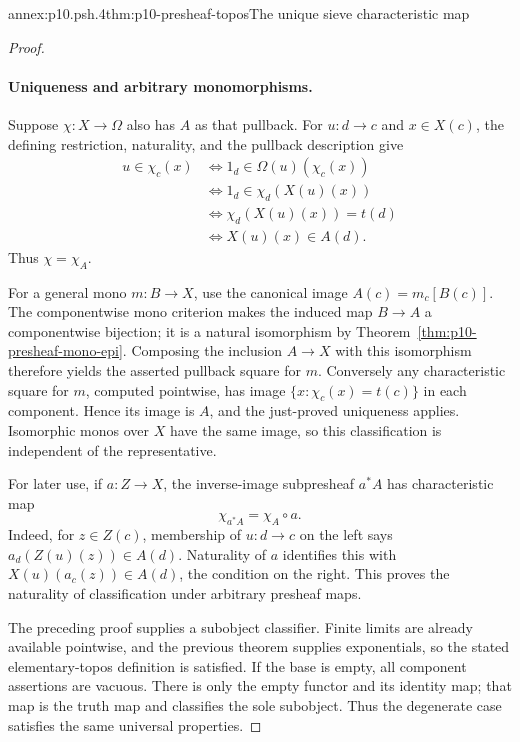 \begin{annexitem}{annex:p10.psh.4}{thm:p10-presheaf-topos}{The unique sieve characteristic map}
\begin{proof}
\paragraph{Uniqueness and arbitrary monomorphisms.}
Suppose \(\chi:X\to\Omega\) also has \(A\) as that pullback.
For \(u:d\to c\) and \(x\in X(c)\), the defining restriction,
naturality, and the pullback description give
\[
\begin{aligned}
 u\in\chi_c(x)
 &\Longleftrightarrow 1_d\in\Omega(u)(\chi_c(x))\\
 &\Longleftrightarrow 1_d\in\chi_d(X(u)(x))\\
 &\Longleftrightarrow \chi_d(X(u)(x))=t(d)\\
 &\Longleftrightarrow X(u)(x)\in A(d).
\end{aligned}
\]
Thus \(\chi=\chi_A\).

For a general mono \(m:B\to X\), use the canonical image
\(A(c)=m_c[B(c)]\).  The componentwise mono criterion makes
the induced map \(B\to A\) a componentwise bijection; it is
a natural isomorphism by
Theorem~\ref{thm:p10-presheaf-mono-epi}.
Composing the inclusion \(A\to X\) with this isomorphism
therefore yields the asserted pullback square for \(m\).
Conversely any characteristic square for \(m\), computed
pointwise, has image
\(\{x:\chi_c(x)=t(c)\}\) in each component.  Hence its image
is \(A\), and the just-proved uniqueness applies.
Isomorphic monos over \(X\) have the same image, so this
classification is independent of the representative.

For later use, if \(a:Z\to X\), the inverse-image
subpresheaf \(a^*A\) has characteristic map
\[
                               \chi_{a^*A}=\chi_A\circ a.
\]
Indeed, for \(z\in Z(c)\), membership of \(u:d\to c\) on
the left says \(a_d(Z(u)(z))\in A(d)\).  Naturality of \(a\)
identifies this with \(X(u)(a_c(z))\in A(d)\), the condition
on the right.  This proves the naturality of classification
under arbitrary presheaf maps.

The preceding proof supplies a subobject classifier.
Finite limits are already available pointwise, and the
previous theorem supplies exponentials, so the stated
elementary-topos definition is satisfied.
If the base is empty, all component assertions are vacuous.
There is only the empty functor and its identity map; that
map is the truth map and classifies the sole subobject.
Thus the degenerate case satisfies the same universal properties.
\end{proof}
\end{annexitem}

